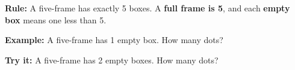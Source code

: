 \documentclass[12pt]{article}
\begin{document}

\begin{formulabox}
\textbf{Rule:} A five-frame has exactly 5 boxes. A \textbf{full frame is 5},
and each \textbf{empty box} means one less than 5.
\end{formulabox}

\begin{examplebox}
\textbf{Example:} \quad A five-frame has 1 empty box. How many dots?
\end{examplebox}

\begin{tryitbox}
\textbf{Try it:} \quad A five-frame has 2 empty boxes. How many dots?\\[2pt]
\end{tryitbox}
\end{document}

